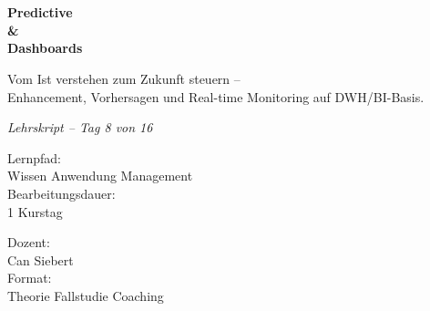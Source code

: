 \documentclass[11pt,a4paper,oneside]{article}
\newcommand{\caveatfontfallback}{\itshape}
\newcommand\caveatfont{\caveatfontfallback}%
\begin{document}
\begin{titlepage}
  \pagestyle{empty}
  \vspace*{1.5cm}
  \\[2pt]
  \noindent{\color{lpAccent}\rule{\linewidth}{1.2pt}}\\[4pt]

  \vspace{3cm}
  {\sffamily\fontsize{30}{34}\selectfont\bfseries\color{lpInk}Predictive\\\&\\Dashboards\par}

  \vspace{0.7cm}
  {\sffamily\large\color{lpGray}Vom Ist verstehen zum Zukunft steuern --\\Enhancement, Vorhersagen und Real-time Monitoring auf DWH/BI-Basis.\par}

  \vspace{1.5cm}
  {\caveatfont\LARGE\color{lpAmber}Lehrskript -- Tag 8 von 16}\par

  \vfill

  \noindent\begin{minipage}{0.55\linewidth}
    {\sffamily\footnotesize\color{lpGray}Lernpfad:}\\
    {\sffamily\small\color{lpInk}Wissen \textrightarrow{} Anwendung \textrightarrow{} Management}\\[10pt]
    {\sffamily\footnotesize\color{lpGray}Bearbeitungsdauer:}\\
    {\sffamily\small\color{lpInk}1 Kurstag}
  \end{minipage}\hfill
  \begin{minipage}{0.4\linewidth}
    \raggedleft
    {\sffamily\footnotesize\color{lpGray}Dozent:}\\
    {\sffamily\small\color{lpInk}Can Siebert}\\[10pt]
    {\sffamily\footnotesize\color{lpGray}Format:}\\
    {\sffamily\small\color{lpInk}Theorie \textperiodcentered{} Fallstudie \textperiodcentered{} Coaching}
  \end{minipage}

  \vspace{0.5cm}
  \noindent{\color{lpAccent}\rule{\linewidth}{0.6pt}}
\end{titlepage}
\end{document}
